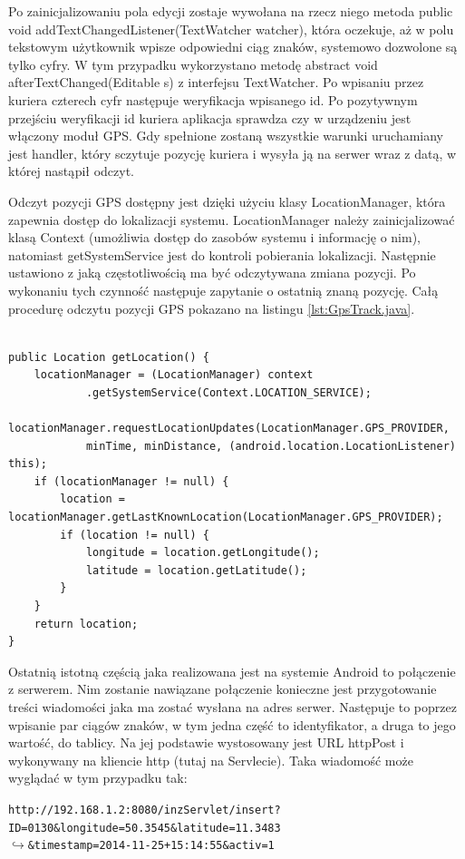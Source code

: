 \documentclass[eng,printmode,oneside]{mgr}
\begin{document}
Po zainicjalizowaniu pola edycji zostaje wywołana na rzecz niego metoda public
void addTextChangedListener(TextWatcher watcher), która oczekuje, aż w polu
tekstowym użytkownik wpisze odpowiedni ciąg znaków, systemowo dozwolone są
tylko cyfry.
W tym przypadku wykorzystano metodę abstract void afterTextChanged(Editable s) z interfejsu
TextWatcher. Po wpisaniu przez kuriera czterech cyfr następuje weryfikacja
wpisanego id. Po pozytywnym przejściu weryfikacji id kuriera aplikacja sprawdza
czy w urządzeniu jest włączony moduł GPS. Gdy spełnione zostaną wszystkie
warunki uruchamiany jest handler, który sczytuje pozycję kuriera i wysyła ją na
serwer wraz z datą, w której nastąpił odczyt. 

Odczyt pozycji GPS dostępny jest dzięki użyciu klasy LocationManager, która
zapewnia dostęp do lokalizacji systemu. LocationManager należy zainicjalizować
klasą Context (umożliwia dostęp do zasobów systemu i informację o nim),
natomiast getSystemService jest do kontroli pobierania lokalizacji. Następnie
ustawiono z jaką częstotliwością ma być odczytywana zmiana pozycji. Po wykonaniu
tych czynność następuje zapytanie o ostatnią znaną pozycję. Całą
procedurę odczytu pozycji GPS pokazano na listingu \ref{lst:GpsTrack.java}.

\begin{lstlisting}[caption=Pobieranie lokalizacji
kuriera metoda getLocation() z klasy GpsTrack,label=lst:GpsTrack.java]

public Location getLocation() {
	locationManager = (LocationManager) context
			.getSystemService(Context.LOCATION_SERVICE);
	locationManager.requestLocationUpdates(LocationManager.GPS_PROVIDER,
			minTime, minDistance, (android.location.LocationListener) this);
	if (locationManager != null) {
		location = locationManager.getLastKnownLocation(LocationManager.GPS_PROVIDER);
		if (location != null) {
			longitude = location.getLongitude();
			latitude = location.getLatitude();
		}
	}
	return location;
}
\end{lstlisting}

Ostatnią istotną częścią jaka realizowana jest na systemie Android to połączenie
z serwerem. Nim zostanie nawiązane połączenie konieczne jest przygotowanie
treści wiadomości jaka ma zostać wysłana na adres serwer. Następuje to poprzez
wpisanie par ciągów znaków, w tym jedna część to identyfikator, a druga to jego
wartość, do tablicy. Na jej podstawie wystosowany jest URL httpPost i wykonywany
na kliencie http (tutaj na Servlecie). Taka wiadomość może wyglądać w tym
przypadku tak:
\begin{flushright}
\texttt{http://192.168.1.2:8080/inzServlet/insert?ID=0130\&longitude=50.3545\&latitude=11.3483
\\$\hookrightarrow$\&timestamp=2014-11-25+15:14:55\&activ=1}
\end{flushright}
\end{document}
